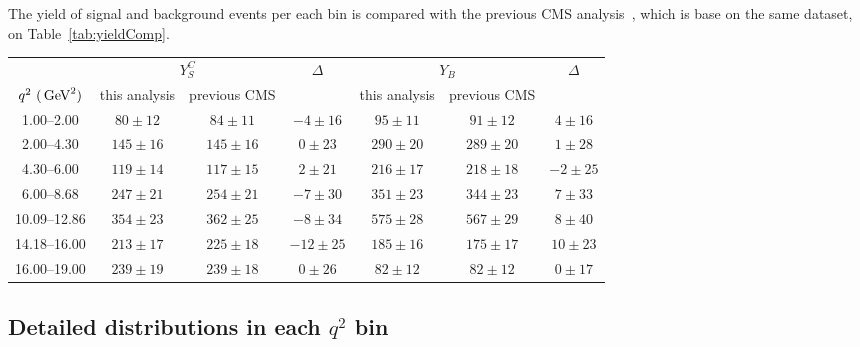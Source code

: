 The yield of signal and background events per each bin is compared with the previous CMS analysis~\cite{AN-14-129}, which is base on the same dataset, on Table~\ref{tab:yieldComp}.

\begin{table*}[!htb]
  \begin{center}
    \begin{footnotesize}
      \caption{Comparison of values of signal yield $Y^{C}_{S}$ and background yield $Y_{B}$ with the same values found in previous CMS analysis.\label{tab:yieldComp}}
      \begin{tabular}{c|ccc|ccc}
        \hline
        & \multicolumn{2}{c}{$Y^{C}_{S}$} & $\Delta$  & \multicolumn{2}{c}{$Y_{B}$} & $\Delta$ \\
        $q^2~(\,\textrm{GeV}^2)$      & this analysis & previous CMS & & this analysis & previous CMS &\\
        \hline         
        1.00--2.00     & $80  \pm 12$ & $ 84 \pm 11$ & $-4\pm16$  &   $ 95\pm 11$    & $ 91 \pm 12$ & $4  \pm 16$\\
        2.00--4.30     & $145 \pm 16$ & $145 \pm 16$ & $0\pm23$   &   $290\pm 20$    & $289 \pm 20$ & $1  \pm 28$\\
        4.30--6.00     & $119 \pm 14$ & $117 \pm 15$ & $2\pm21$   &   $216\pm 17$    & $218 \pm 18$ & $-2 \pm 25$\\
        6.00--8.68     & $247 \pm 21$ & $254 \pm 21$ & $-7\pm30$  &   $351\pm 23$    & $344 \pm 23$ & $7  \pm 33$\\
        10.09--12.86   & $354 \pm 23$ & $362 \pm 25$ & $-8\pm34$  &   $575\pm 28$    & $567 \pm 29$ & $8  \pm 40$\\
        14.18--16.00   & $213 \pm 17$ & $225 \pm 18$ & $-12\pm25$ &   $185\pm 16$    & $175 \pm 17$ & $10 \pm 23$\\
        16.00--19.00   & $239 \pm 19$ & $239 \pm 18$ & $0\pm26$   &   $ 82\pm 12$    & $ 82 \pm 12$ & $0  \pm 17$\\

        \hline
      \end{tabular}
    \end{footnotesize}
  \end{center}
\end{table*}



\clearpage

\subsection{Detailed distributions in each $q^2$ bin}
\label{sec:res-proj}

